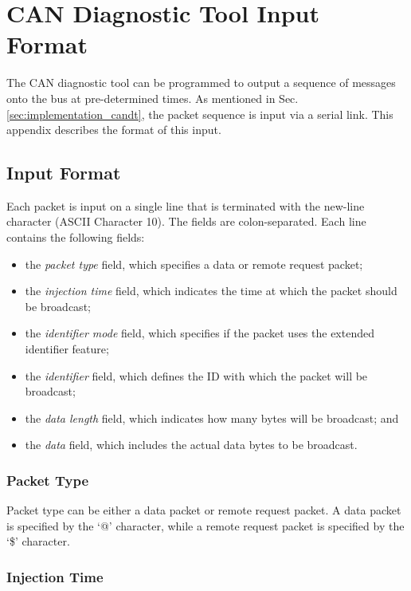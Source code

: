 
\chapter{CAN Diagnostic Tool Input Format}
\label{apx:candt}

The CAN diagnostic tool can be programmed to output a sequence of messages onto the bus at pre-determined times. As mentioned in Sec. \ref{sec:implementation_candt}, the packet sequence is input via a serial link. This appendix describes the format of this input.

\section*{Input Format}

Each packet is input on a single line that is terminated with the new-line character (ASCII Character 10). The fields are colon-separated. Each line contains the following fields:

\begin{itemize}
	\item the \emph{packet type} field, which specifies a data or remote request packet;
	\item the \emph{injection time} field, which indicates the time at which the packet should be broadcast;
	\item the \emph{identifier mode} field, which specifies if the packet uses the extended identifier feature;
	\item the \emph{identifier} field, which defines the ID with which the packet will be broadcast;
	\item the \emph{data length} field, which indicates how many bytes will be broadcast; and
	\item the \emph{data} field, which includes the actual data bytes to be broadcast.
\end{itemize}

\subsection*{Packet Type}

Packet type can be either a data packet or remote request packet. A data packet is specified by the `@' character, while a remote request packet is specified by the `\$' character.

\subsection*{Injection Time}

